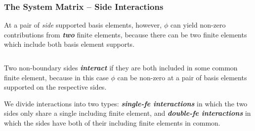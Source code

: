 \documentclass[compress]{beamer}
\begin{document}
\begin{frame}
  \frametitle{The System Matrix -- Side Interactions}
  At a pair of \emph{side} supported basis elements, however, $\phi$ can yield non-zero contributions from \emph{\textbf{two}}
  finite elements, because there can be two finite elements which include both basis element supports.
  \pause
  \begin{columns}
  \end{columns}

  \pause
  \vspace{.15cm}
  Two non-boundary sides \emph{\textbf{interact}} if they are both included in some common finite element, because in this case $\phi$ can
  be non-zero at a pair of basis elements supported on the respective sides.
  
  \pause
  \vspace{.15cm}
  We divide interactions into two types: \emph{\textbf{single-fe interactions}} in which the two sides only share a single including
  finite element, and \emph{\textbf{double-fe interactions}} in which the sides have both of their including finite elements in common.
\end{frame}
\end{document}
